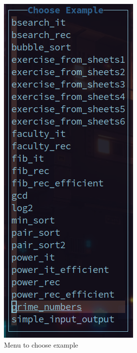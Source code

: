 \documentclass{report}
\begin{document}
\begin{figure}[H]
\begin{minipage}[t]{0.49\textwidth}
\begin{minipage}[b]{0.5\textwidth}
			\includegraphics[width=\textwidth]{./figures/menu_example.png}
		\end{minipage}
		\caption{Menu to choose example}
    \label{fig:menu example}
	\end{minipage}
\end{figure}
\end{document}
